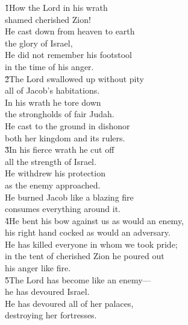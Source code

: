 \begin{poetry}
\poeml {}
\v{1}How the Lord in his wrath \\
\poemll    shamed cherished Zion! \\
\poeml He cast down from heaven to earth \\
\poemll    the glory of Israel, \\
\poeml He did not remember his footstool \\
\poemll    in the time of his anger. \\
\poeml \v{2}The Lord swallowed up without pity \\
\poemll    all of Jacob's habitations. \\
\poeml In his wrath he tore down \\
\poemll    the strongholds of fair Judah. \\
\poeml He cast to the ground in dishonor \\
\poemll    both her kingdom and its rulers. \\
\poeml \v{3}In his fierce wrath he cut off \\
\poemll    all the strength of Israel. \\
\poeml He withdrew his protection \\
\poemll    as the enemy approached. \\
\poeml He burned Jacob like a blazing fire \\
\poemll    consumes everything around it. \\
\poeml \v{4}He bent his bow against us as would an enemy, \\
\poemll    his right hand cocked as would an adversary. \\
\poeml He has killed everyone in whom we took pride; \\
\poemll    in the tent of cherished Zion he poured out \\
\poemlll       his anger like fire. \\
\poeml \v{5}The Lord has become like an enemy--- \\
\poemll    he has devoured Israel. \\
\poeml He has devoured all of her palaces, \\
\poemll    destroying her fortresses. \\

\end{poetry}
